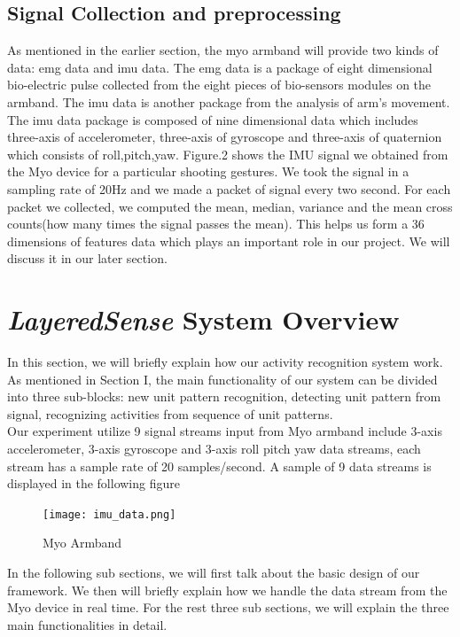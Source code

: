 \documentclass[a4paper, 10pt, conference]{IEEEtran}      %
\begin{document}
\subsection{Signal Collection and preprocessing}
As mentioned in the earlier section, the myo armband will provide two kinds of data: emg data and imu data. The emg data is a package of eight dimensional bio-electric pulse collected from the eight pieces of bio-sensors modules on the armband. The imu data is another package from the analysis of arm's movement. The imu data package is composed of nine dimensional data which includes three-axis of accelerometer, three-axis of gyroscope and three-axis of quaternion which consists of roll,pitch,yaw. Figure.2 shows the IMU signal we obtained from the Myo device for a particular shooting gestures. We took the signal in a sampling rate of 20Hz and we made a packet of signal every two second. For each packet we collected, we computed the mean, median, variance and the mean cross counts(how many times the signal passes the mean). This helps us form a 36 dimensions of features data which plays an important role in our project. We will discuss it in our later section. 


\section{\emph{LayeredSense} System Overview}
In this section, we will briefly explain how our activity recognition system work. As mentioned in Section I, the main functionality of our system can be divided into three sub-blocks: new unit pattern recognition, detecting unit pattern from signal, recognizing activities from sequence of unit patterns.\\

Our experiment utilize 9 signal streams input from Myo armband include 3-axis accelerometer, 3-axis gyroscope and 3-axis roll pitch yaw data streams, each stream has a sample rate of 20 samples/second. A sample of 9 data streams is displayed in the following figure\\

\begin{figure}[thpb]
      \centering
      \texttt{[image: imu\_data.png]} 
      \caption{Myo Armband}
      \label{img_label1}
\end{figure}     


In the following sub sections, we will first talk about the basic design of our framework.  We then will briefly explain how we handle the data stream from the Myo device in real time. For the rest three sub sections, we will explain the three main functionalities in detail.
\end{document}
